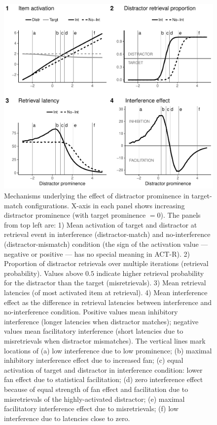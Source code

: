 \documentclass{cambridge7A}\usepackage[]{graphicx}\usepackage[]{color}
\begin{document}
\begin{figure}[!htbp]
\centering
%
\includegraphics[width=\textwidth]{figures/ensemble-lines-match}
%
 \caption{Mechanisms underlying the effect of distractor prominence in target-match configurations. 
 	X-axis in each panel shows increasing distractor prominence (with target prominence $=0$).
 	The panels from top left are:
 		1) Mean activation of target and distractor at retrieval event in interference (distractor-match) and no-interference (distractor-mismatch) condition (the sign of the activation value --- negative or positive --- has no special meaning in ACT-R).
 		2) Proportion of distractor retrievals over multiple iterations (retrieval probability). Values above $0.5$ indicate higher retrieval probability for the distractor than the target (misretrievals).
 		3) Mean retrieval latencies (of most activated item at retrieval).
 		4) Mean interference effect as the difference in retrieval latencies between interference and no-interference condition. Positive values mean inhibitory interference (longer latencies when distractor matches); negative values mean facilitatory interference (short latencies due to misretrievals when distractor mismatches).
 	The vertical lines mark locations of 
 		(a) low interference due to low prominence;
 		(b) maximal inhibitory interference effect due to increased fan;
 		(c) equal activation of target and distractor in interference condition: lower fan effect due to statistical facilitation;
 		(d) zero interference effect because of equal strength of fan effect and facilitation due to misretrievals of the highly-activated distractor;
 		(e) maximal facilitatory interference effect due to misretrievals;
 		(f) low interference due to latencies close to zero.
 		}
 \label{fig:promEnsMatch} 
\end{figure}
\end{document}
